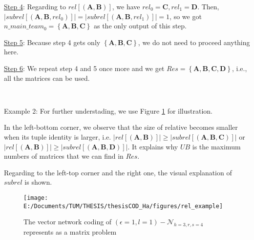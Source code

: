 \uline{Step 4}: Regarding to $rel\left[\left(\boldsymbol{A},\boldsymbol{B}\right)\right]$,
we have $rel_{0}=\boldsymbol{C},rel_{1}=\boldsymbol{D}$. Then, $\left|subrel\left[\left(\boldsymbol{A},\boldsymbol{B},rel_{0}\right)\right]\right|=\left|subrel\left[\left(\boldsymbol{A},\boldsymbol{B},rel_{1}\right)\right]\right|=1$,
so we got $n\_main\_team_{0}=\left\{ \boldsymbol{A},\boldsymbol{B},\boldsymbol{C}\right\} $
as the only output of this step.

\uline{Step 5}: Because step 4 gets only $\left\{ \boldsymbol{A},\boldsymbol{B},\boldsymbol{C}\right\} $,
we do not need to proceed anything here.

\uline{Step 6}: We repeat step 4 and 5 once more and we get $Res=\left\{ \boldsymbol{A},\boldsymbol{B},\boldsymbol{C},\boldsymbol{D}\right\} $,
i.e., all the matrices can be used.

~

Example 2: For further understading, we use Figure \ref{fig:rel_example}
for illustration.

In the left-bottom corner, we observe that the size of relative becomes
smaller when its tuple identity is larger, i.e. $\left|rel\left[\left(\boldsymbol{A},\boldsymbol{B}\right)\right]\right|\geq\left|subrel\left[\left(\boldsymbol{A},\boldsymbol{B},\boldsymbol{C}\right)\right]\right|$
or $\left|rel\left[\left(\boldsymbol{A},\boldsymbol{B}\right)\right]\right|\geq\left|subrel\left[\left(\boldsymbol{A},\boldsymbol{B},\boldsymbol{D}\right)\right]\right|$.
It explains why $UB$ is the maximum numbers of matrices that we can
find in $Res$.

Regarding to the left-top corner and the right one, the visual explanation
of $subrel$ is shown.

\begin{figure}[H]
\caption{The vector network coding of $(\epsilon=1,l=1)-\mathcal{N}_{h=3,r,s=4}$
represents as a matrix problem\label{fig:rel_example}}

\texttt{[image: E:/Documents/TUM/THESIS/thesisCOD\_Ha/figures/rel\_example]}
\end{figure}

\clearpage